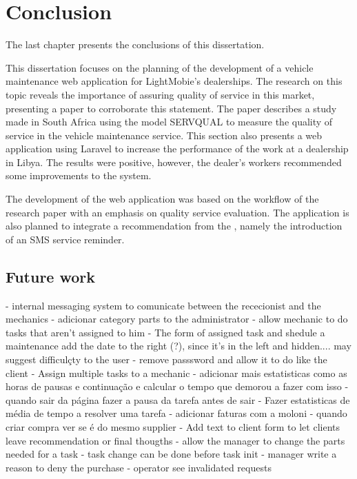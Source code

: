 \chapter{Conclusion}%
\label{chapter:conclusion}

\begin{introduction}
The last chapter presents the conclusions of this dissertation.
\end{introduction} 


This dissertation focuses on the planning of the development of a vehicle maintenance web application for LightMobie's dealerships. 
The research on this topic reveals the importance of assuring quality of service in this market, presenting a paper to corroborate this statement.
The paper describes a study made in South Africa using the model SERVQUAL to measure the quality of service in the vehicle maintenance service.
This section also presents a web application using Laravel to increase the performance of the work at a dealership in Libya. 
The results were positive, however, the dealer's workers recommended some improvements to the system.

The development of the web application was based on the workflow of the research paper with an emphasis on quality service evaluation.
The application is also planned to integrate a recommendation from the \citet{MAS_MOTORS}, namely the introduction of an SMS service reminder. 


\section{Future work}

- internal messaging system to comunicate between the rececionist and the mechanics
- adicionar category parts to the administrator
- allow mechanic to do tasks that aren't assigned to him
- The form of assigned task and shedule a maintenance add the date to the right (?), since it's in the left and hidden.... may suggest difficulçty to the user
- remove passsword and allow it to do like the client
- Assign multiple tasks to a mechanic
- adicionar mais estatisticas como as horas de pausas e continuação e calcular o tempo que demorou a fazer com isso
- quando sair da página fazer a pausa da tarefa antes de sair
- Fazer estatisticas de média de tempo a resolver uma tarefa
- adicionar faturas com a moloni
- quando criar compra ver se é do mesmo supplier
- Add text to client form to let clients leave recommendation or final thougths
- allow the manager to change the parts needed for a task
- task change can be done before task init 
- manager write a reason to deny the purchase
- operator see invalidated requests

\section{}